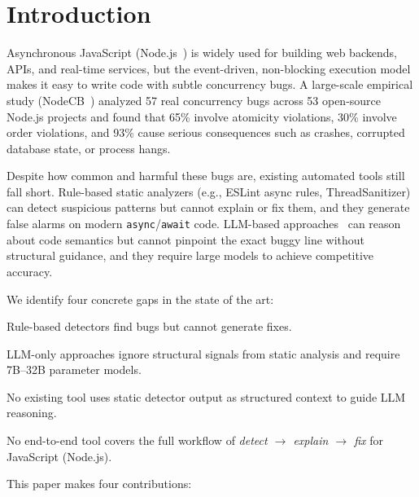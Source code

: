 \documentclass[runningheads]{llncs}
\begin{document}
\section{Introduction}
\label{sec:intro}

Asynchronous JavaScript (Node.js~\cite{nodejs}) is widely used for building
web backends, APIs, and real-time services, but the event-driven, non-blocking
execution model makes it easy to write code with subtle concurrency bugs.
A large-scale empirical study (NodeCB~\cite{nodecb2017}) analyzed 57 real
concurrency bugs across 53 open-source Node.js projects and found that
65\% involve atomicity violations, 30\% involve order violations, and
93\% cause serious consequences such as crashes, corrupted database state,
or process hangs.

Despite how common and harmful these bugs are, existing automated tools
still fall short.
Rule-based static analyzers (e.g., ESLint async rules, ThreadSanitizer)
can detect suspicious patterns but cannot explain or fix them, and they
generate false alarms on modern \texttt{async}/\texttt{await} code.
LLM-based approaches~\cite{pcwms2026} can reason about code semantics but
cannot pinpoint the exact buggy line without structural guidance, and they
require large models to achieve competitive accuracy.

We identify four concrete gaps in the state of the art:

\begin{description}[leftmargin=2em]
  \item[G1] Rule-based detectors find bugs but cannot generate fixes.
  \item[G2] LLM-only approaches ignore structural signals from
    static analysis and require 7B--32B parameter models.
  \item[G3] No existing tool uses static detector output as
    structured context to guide LLM reasoning.
  \item[G4] No end-to-end tool covers the full workflow of
    \emph{detect $\to$ explain $\to$ fix} for JavaScript (Node.js).
\end{description}

This paper makes four contributions:
\end{document}
